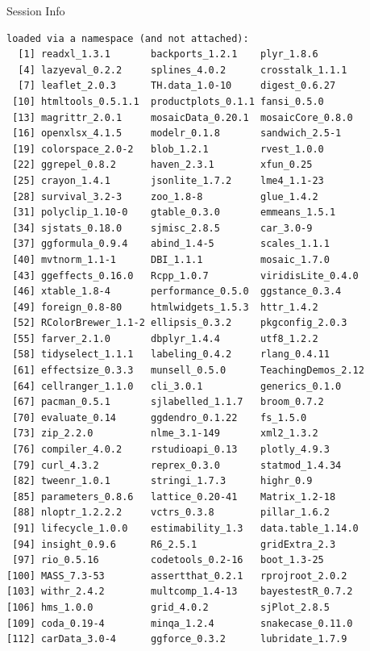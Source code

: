 \documentclass[10pt]{beamer}\usepackage[]{graphicx}\usepackage[]{color}
\makeatletter
\newenvironment{kframe}{%
 \def\at@end@of@kframe{}%
 \ifinner\ifhmode%
  \def\at@end@of@kframe{\end{minipage}}%
  \begin{minipage}{\columnwidth}%
 \fi\fi%
 \def\FrameCommand##1{\hskip\@totalleftmargin \hskip-\fboxsep
 \colorbox{shadecolor}{##1}\hskip-\fboxsep
     \hskip-\linewidth \hskip-\@totalleftmargin \hskip\columnwidth}%
 \MakeFramed {\advance\hsize-\width
   \@totalleftmargin\z@ \linewidth\hsize
   \@setminipage}}%
 {\par\unskip\endMakeFramed%
 \at@end@of@kframe}
\newenvironment{knitrout}{}{} %
\makeatother
\begin{document}
\begin{frame}[fragile]{Session Info}
\begin{knitrout}
\begin{kframe}
\begin{verbatim}
loaded via a namespace (and not attached):
  [1] readxl_1.3.1       backports_1.2.1    plyr_1.8.6        
  [4] lazyeval_0.2.2     splines_4.0.2      crosstalk_1.1.1   
  [7] leaflet_2.0.3      TH.data_1.0-10     digest_0.6.27     
 [10] htmltools_0.5.1.1  productplots_0.1.1 fansi_0.5.0       
 [13] magrittr_2.0.1     mosaicData_0.20.1  mosaicCore_0.8.0  
 [16] openxlsx_4.1.5     modelr_0.1.8       sandwich_2.5-1    
 [19] colorspace_2.0-2   blob_1.2.1         rvest_1.0.0       
 [22] ggrepel_0.8.2      haven_2.3.1        xfun_0.25         
 [25] crayon_1.4.1       jsonlite_1.7.2     lme4_1.1-23       
 [28] survival_3.2-3     zoo_1.8-8          glue_1.4.2        
 [31] polyclip_1.10-0    gtable_0.3.0       emmeans_1.5.1     
 [34] sjstats_0.18.0     sjmisc_2.8.5       car_3.0-9         
 [37] ggformula_0.9.4    abind_1.4-5        scales_1.1.1      
 [40] mvtnorm_1.1-1      DBI_1.1.1          mosaic_1.7.0      
 [43] ggeffects_0.16.0   Rcpp_1.0.7         viridisLite_0.4.0 
 [46] xtable_1.8-4       performance_0.5.0  ggstance_0.3.4    
 [49] foreign_0.8-80     htmlwidgets_1.5.3  httr_1.4.2        
 [52] RColorBrewer_1.1-2 ellipsis_0.3.2     pkgconfig_2.0.3   
 [55] farver_2.1.0       dbplyr_1.4.4       utf8_1.2.2        
 [58] tidyselect_1.1.1   labeling_0.4.2     rlang_0.4.11      
 [61] effectsize_0.3.3   munsell_0.5.0      TeachingDemos_2.12
 [64] cellranger_1.1.0   cli_3.0.1          generics_0.1.0    
 [67] pacman_0.5.1       sjlabelled_1.1.7   broom_0.7.2       
 [70] evaluate_0.14      ggdendro_0.1.22    fs_1.5.0          
 [73] zip_2.2.0          nlme_3.1-149       xml2_1.3.2        
 [76] compiler_4.0.2     rstudioapi_0.13    plotly_4.9.3      
 [79] curl_4.3.2         reprex_0.3.0       statmod_1.4.34    
 [82] tweenr_1.0.1       stringi_1.7.3      highr_0.9         
 [85] parameters_0.8.6   lattice_0.20-41    Matrix_1.2-18     
 [88] nloptr_1.2.2.2     vctrs_0.3.8        pillar_1.6.2      
 [91] lifecycle_1.0.0    estimability_1.3   data.table_1.14.0 
 [94] insight_0.9.6      R6_2.5.1           gridExtra_2.3     
 [97] rio_0.5.16         codetools_0.2-16   boot_1.3-25       
[100] MASS_7.3-53        assertthat_0.2.1   rprojroot_2.0.2   
[103] withr_2.4.2        multcomp_1.4-13    bayestestR_0.7.2  
[106] hms_1.0.0          grid_4.0.2         sjPlot_2.8.5      
[109] coda_0.19-4        minqa_1.2.4        snakecase_0.11.0  
[112] carData_3.0-4      ggforce_0.3.2      lubridate_1.7.9   
\end{verbatim}
\end{kframe}
\end{knitrout}
	
\end{frame}
\end{document}
